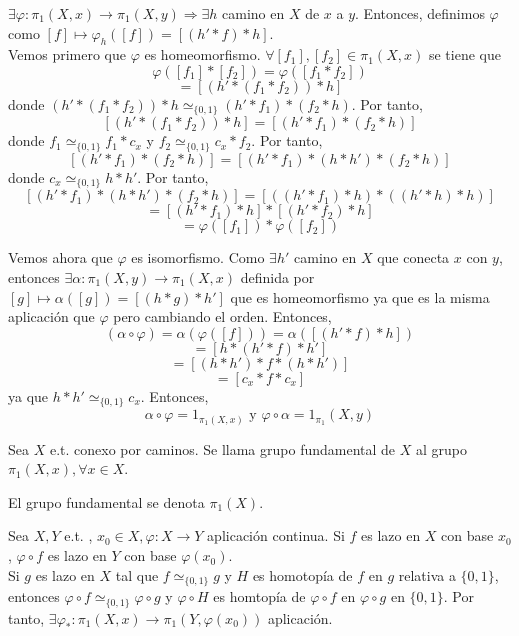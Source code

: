 \begin{dem}
  $\exists \varphi : \pi_{1}(X, x) \to \pi_{1}(X, y) \Rightarrow \exists h$ camino en $X$ de $x$ a $y$. Entonces, definimos $\varphi$ como $[f] \mapsto \varphi_{h}([f]) = [(h' * f) * h]$. \\

  Vemos primero que $\varphi$ es homeomorfismo. $\forall [f_{1}], [f_{2}] \in \pi_{1}(X,x)$ se tiene que 
  \[ 
    \varphi([f_{1}] * [f_{2}]) = \varphi ([f_{1} * f_{2}]) 
  \] 
  \[ 
     = [(h' * (f_{1} * f_{2})) * h ] 
  \] 
  donde $ (h' * (f_{1} * f_{2})) * h \simeq_{\{ 0,1 \}} (h' * f_{1}) * (f_{2} * h)$. Por tanto,
  \[ 
    [(h' * (f_{1} * f_{2})) * h ] = [(h' * f_{1}) * (f_{2} * h)]
  \] 
  donde $f_{1} \simeq_{\{ 0, 1\}} f_{1} * c_{x}$ y $f_{2} \simeq_{\{ 0, 1\}} c_{x} * f_{2}$. Por tanto,
  \[ 
    [(h' * f_{1}) * (f_{2} * h)] = [(h' * f_{1}) * (h * h') * (f_{2} * h)]
  \] 
  donde $c_{x} \simeq_{\{ 0, 1 \}} h * h'$. Por tanto,
  \[ 
    [(h' * f_{1}) * (h * h') * (f_{2} * h)] = [((h' * f_{1}) * h) * ((h' * h) * h)]
  \] 
  \[ 
    = [(h' * f_{1}) * h] * [(h' * f_{2}) * h] 
  \] 
  \[ 
    = \varphi([f_{1}]) * \varphi([f_{2}])
  \] 

  Vemos ahora que $\varphi$ es isomorfismo. Como $\exists h'$ camino en $X$ que conecta $x$ con $y$, entonces $\exists \alpha :  \pi_{1}(X, y) \to \pi_{1}(X, x)$ definida por $[g] \mapsto \alpha([g]) = [(h * g) * h']$ que es homeomorfismo ya que es la misma aplicación que $\varphi$ pero cambiando el orden. Entonces,
  \[ 
    (\alpha \circ \varphi) = \alpha(\varphi ([f])) = \alpha([(h' * f) * h ])
  \] 
  \[ 
    = [h * (h' * f) * h'] 
  \] 
  \[ 
    = [(h * h') * f * (h * h')] 
  \] 
  \[ 
    = [c_{x} * f * c_{x}] 
  \] 
  ya que $h * h' \simeq_{\{ 0, 1 \}} c_{x}$. Entonces, 
  \[ 
    \alpha \circ \varphi = 1_{\pi_{1}(X,x)} \text{ y } \varphi \circ \alpha = 1_{\pi_{1}}(X, y)
  \]          
\end{dem}

\begin{defn}
  Sea $X$ e.t. conexo por caminos. Se llama grupo fundamental de $X$ al grupo $\pi_{1}(X,x), \forall x \in X$.
\end{defn}

\begin{nota}
  El grupo fundamental se denota $\pi_{1}(X)$.
\end{nota}

\begin{obs}
  Sea $X, Y$ e.t. , $x_{0} \in X, \varphi : X \to Y$ aplicación continua. Si $f$ es lazo en $X$ con base $x_{0}$, $\varphi \circ f$ es lazo en $Y$ con base $\varphi(x_{0})$. \\

  Si $g$ es lazo en $X$ tal que $f \simeq_{\{ 0, 1 \}} g$ y $H$ es homotopía de $f$ en $g$ relativa a $\{ 0, 1 \}$, entonces $\varphi \circ f \simeq_{\{ 0, 1 \}} \varphi \circ g$ y $\varphi \circ H$ es homtopía de $\varphi  \circ f$ en $\varphi \circ g$ en $\{ 0, 1 \}$. Por tanto, $\exists \varphi_{*} : \pi_{1}(X, x) \to \pi_{1}(Y, \varphi(x_{0}))$ aplicación.
\end{obs} 

